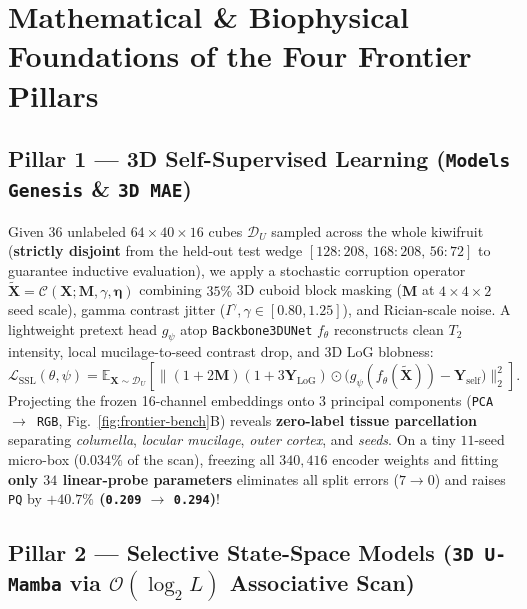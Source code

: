 \documentclass[10.5pt,a4paper]{article}
\begin{document}
\section{Mathematical \& Biophysical Foundations of the Four Frontier Pillars}
\label{sec:frontier-pillars}

\subsection{Pillar 1 --- 3D Self-Supervised Learning (\texttt{Models Genesis} \& \texttt{3D MAE})}

Given $36$ unlabeled $64\times 40\times 16$ cubes $\mathcal{D}_U$ sampled across the whole kiwifruit (\textbf{strictly disjoint} from the held-out test wedge $[128\!:\!208,\, 168\!:\!208,\, 56\!:\!72]$ to guarantee inductive evaluation), we apply a stochastic corruption operator $\tilde{\mathbf{X}} = \mathcal{C}(\mathbf{X}; \mathbf{M}, \gamma, \boldsymbol{\eta})$ combining $35\%$ 3D cuboid block masking ($\mathbf{M}$ at $4\times 4\times 2$ seed scale), gamma contrast jitter ($I^\gamma, \gamma \in [0.80, 1.25]$), and Rician-scale noise. A lightweight pretext head $g_\psi$ atop \texttt{Backbone3DUNet} $f_\theta$ reconstructs clean $T_2$ intensity, local mucilage-to-seed contrast drop, and 3D LoG blobness:
\begin{equation}
    \mathcal{L}_{\text{SSL}}(\theta, \psi) = \mathbb{E}_{\mathbf{X}\sim\mathcal{D}_U}\!\left[\big\lVert (1 + 2\mathbf{M})(1 + 3\mathbf{Y}_{\text{LoG}}) \odot \big(g_\psi(f_\theta(\tilde{\mathbf{X}})) - \mathbf{Y}_{\text{self}}\big) \big\rVert_2^2\right].
\end{equation}
Projecting the frozen 16-channel embeddings onto 3 principal components (\texttt{PCA $\rightarrow$ RGB}, Fig.~\ref{fig:frontier-bench}B) reveals \textbf{zero-label tissue parcellation} separating \emph{columella}, \emph{locular mucilage}, \emph{outer cortex}, and \emph{seeds}. On a tiny $11$-seed micro-box ($0.034\%$ of the scan), freezing all $340{,}416$ encoder weights and fitting \textbf{only $34$ linear-probe parameters} eliminates all split errors ($7 \rightarrow 0$) and raises \texttt{PQ} by \textbf{$+40.7\%$ (\texttt{0.209} $\rightarrow$ \texttt{0.294})}!

\subsection{Pillar 2 --- Selective State-Space Models (\texttt{3D U-Mamba} via \texorpdfstring{$\mathcal{O}(\log_2 L)$}{O(log2 L)} Associative Scan)}
\end{document}
